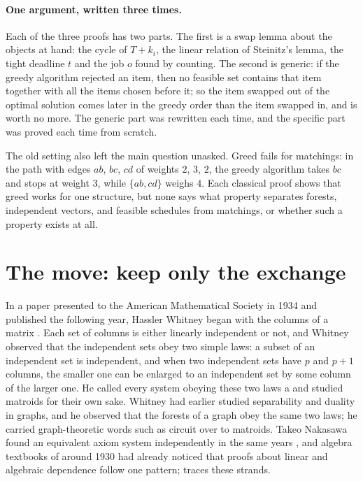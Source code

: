 \begin{refsection}
\paragraph{One argument, written three times.} Each of the three proofs has two parts. The first is a swap lemma about the objects at hand: the cycle of $T+k_i$, the linear relation of Steinitz's lemma, the tight deadline $t$ and the job $o$ found by counting. The second is generic: if the greedy algorithm rejected an item, then no feasible set contains that item together with all the items chosen before it; so the item swapped out of the optimal solution comes later in the greedy order than the item swapped in, and is worth no more. The generic part was rewritten each time, and the specific part was proved each time from scratch.

The old setting also left the main question unasked. Greed fails for matchings: in the path with edges $ab$, $bc$, $cd$ of weights $2$, $3$, $2$, the greedy algorithm takes $bc$ and stops at weight $3$, while $\{ab,cd\}$ weighs $4$. Each classical proof shows that greed works for one structure, but none says what property separates forests, independent vectors, and feasible schedules from matchings, or whether such a property exists at all.

\section{The move: keep only the exchange}\label{sec:matroid:move}

In a paper presented to the American Mathematical Society in 1934 and published the following year, Hassler Whitney began with the columns of a matrix \parencite{Whitney1935}. Each set of columns is either linearly independent or not, and Whitney observed that the independent sets obey two simple laws: a subset of an independent set is independent, and when two independent sets have $p$ and $p+1$ columns, the smaller one can be enlarged to an independent set by some column of the larger one. He called every system obeying these two laws a  and studied matroids for their own sake. Whitney had earlier studied separability and duality in graphs, and he observed that the forests of a graph obey the same two laws; he carried graph-theoretic words such as circuit over to matroids. Takeo Nakasawa found an equivalent axiom system independently in the same years \parencite{Nakasawa1935}, and algebra textbooks of around 1930 had already noticed that proofs about linear and algebraic dependence follow one pattern; \textcite[Section~39.10b]{Schrijver2003} traces these strands.


\end{refsection}
